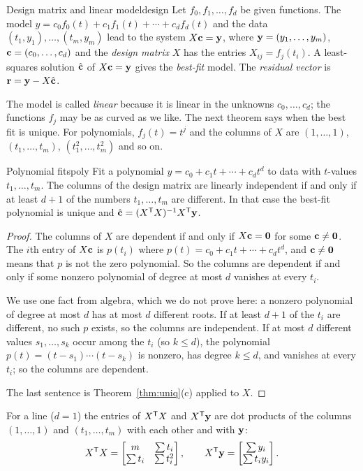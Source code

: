 \documentclass[11pt]{article}
\begin{document}
\begin{defn}{Design matrix and linear model}{design}
Let $f_0,f_1,\dots,f_d$ be given functions. The model $y=c_0f_0(t)+c_1f_1(t)+\cdots+c_df_d(t)$ and the data $(t_1,y_1),\dots,(t_m,y_m)$ lead to the system $X\mathbf{c}=\mathbf{y}$, where $\mathbf{y}=(y_1,\dots,y_m)$, $\mathbf{c}=(c_0,\dots,c_d)$ and the \emph{design matrix} $X$ has the entries $X_{ij}=f_j(t_i)$. A least-squares solution $\hat{\mathbf{c}}$ of $X\mathbf{c}=\mathbf{y}$ gives the \emph{best-fit} model. The \emph{residual vector} is $\mathbf{r}=\mathbf{y}-X\hat{\mathbf{c}}$.
\end{defn}

The model is called \emph{linear} because it is linear in the unknowns $c_0,\dots,c_d$; the functions $f_j$ may be as curved as we like. The next theorem says when the best fit is unique. For polynomials, $f_j(t)=t^j$ and the columns of $X$ are $(1,\dots,1)$, $(t_1,\dots,t_m)$, $(t_1^2,\dots,t_m^2)$ and so on.

\begin{thm}{Polynomial fits}{poly}
Fit a polynomial $y=c_0+c_1t+\cdots+c_dt^d$ to data with $t$-values $t_1,\dots,t_m$. The columns of the design matrix are linearly independent if and only if at least $d+1$ of the numbers $t_1,\dots,t_m$ are different. In that case the best-fit polynomial is unique and $\hat{\mathbf{c}}=(X^{\mathsf T} X)^{-1}X^{\mathsf T}\mathbf{y}$.
\end{thm}

\begin{proof}
The columns of $X$ are dependent if and only if $X\mathbf{c}=\mathbf{0}$ for some $\mathbf{c}\neq\mathbf{0}$. The $i$th entry of $X\mathbf{c}$ is $p(t_i)$ where $p(t)=c_0+c_1t+\cdots+c_dt^d$, and $\mathbf{c}\neq\mathbf{0}$ means that $p$ is not the zero polynomial. So the columns are dependent if and only if some nonzero polynomial of degree at most $d$ vanishes at every $t_i$.

We use one fact from algebra, which we do not prove here: a nonzero polynomial of degree at most $d$ has at most $d$ different roots. If at least $d+1$ of the $t_i$ are different, no such $p$ exists, so the columns are independent. If at most $d$ different values $s_1,\dots,s_k$ occur among the $t_i$ (so $k\le d$), the polynomial $p(t)=(t-s_1)\cdots(t-s_k)$ is nonzero, has degree $k\le d$, and vanishes at every $t_i$; so the columns are dependent.

The last sentence is Theorem~\ref{thm:uniq}(c) applied to $X$.
\end{proof}

For a line ($d=1$) the entries of $X^{\mathsf T} X$ and $X^{\mathsf T}\mathbf{y}$ are dot products of the columns $(1,\dots,1)$ and $(t_1,\dots,t_m)$ with each other and with $\mathbf{y}$:
\[
X^{\mathsf T} X=\begin{bmatrix}m&\sum t_i\\\sum t_i&\sum t_i^2\end{bmatrix},\qquad X^{\mathsf T}\mathbf{y}=\begin{bmatrix}\sum y_i\\\sum t_iy_i\end{bmatrix}.
\]
\end{document}
